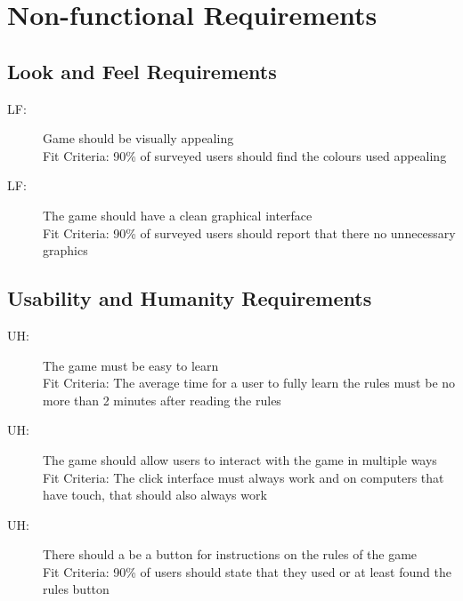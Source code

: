 \documentclass[12pt, titlepage]{article}
\newcounter{lfreq}
\newcommand{\lfthelfreq}{LF\thelfreq}
\newcounter{uhreq}
\newcommand{\uhtheuhreq}{UH\theuhreq}
\begin{document}
\section{Non-functional Requirements}

\subsection{Look and Feel Requirements}
\begin{description}
\item [ \lfthelfreq:] Game should be visually appealing\\
Fit Criteria: 90\% of surveyed users should find the colours used appealing
\item [ \lfthelfreq:] The game should have a clean graphical interface\\
Fit Criteria: 90\% of surveyed users should report that there no unnecessary graphics
\end{description}

\subsection{Usability and Humanity Requirements}
\begin{description}
\item [ \uhtheuhreq:] The game must be easy to learn\\
Fit Criteria: The average time for a user to fully learn the rules must be no more than 2 minutes after reading the rules
\item [ \uhtheuhreq:] The game should allow users to interact with the game in multiple ways\\
Fit Criteria: The click interface must always work and on computers that have touch, that should also always work
\item [ \uhtheuhreq:] There should a be a button for instructions on the rules of the game\\Fit Criteria: 90\% of users should state that they used or at least found the rules button
\end{description}
\end{document}

